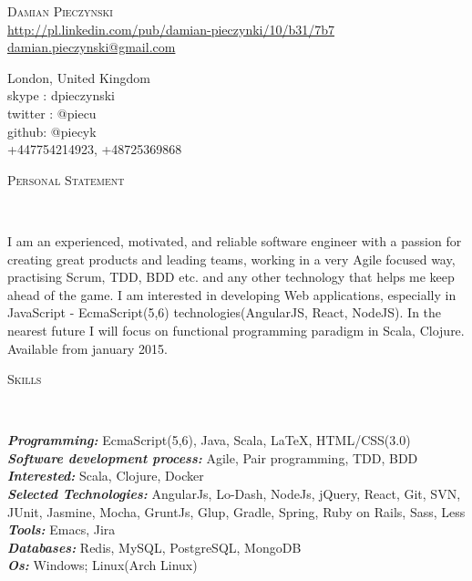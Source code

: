 \documentclass[9pt]{article}
\newenvironment{changemargin}[2]{%
  \begin{list}{}{%
      \setlength{\topsep}{0pt}%
      \setlength{\leftmargin}{#1}%
      \setlength{\rightmargin}{#2}%
      \setlength{\listparindent}{\parindent}%
      \setlength{\itemindent}{\parindent}%
      \setlength{\parsep}{\parskip}%
    }%
  \item[]}{\end{list}
}
\newcommand{\lineover}{
  \begin{changemargin}{-0.05in}{-0.05in}
    \vspace*{-8pt}
    \hrulefill \\
    \vspace*{-2pt}
  \end{changemargin}
}
\newcommand{\header}[1]{
	\begin{changemargin}{-0.5in}{-0.5in}
		\scshape{#1}\\
  	\lineover
	\end{changemargin}
}
\newcommand{\contact}[3]{
	\begin{changemargin}{-0.5in}{-0.5in}
		\begin{center}
			{\Large \scshape {#1}}\\ \smallskip
      {\url{#2}}\\ \smallskip
      {\href{mailto:#3}{#3}}\\ \smallskip
		\end{center}
	\end{changemargin}
}
\newenvironment{body} {
	\vspace*{-16pt}
	\begin{changemargin}{-0.25in}{-0.5in}
  }
	{\end{changemargin}
}
\begin{document}
\contact
    {Damian Pieczynski}
    {http://pl.linkedin.com/pub/damian-pieczynki/10/b31/7b7}
    {damian.pieczynski@gmail.com}
    {London, United Kingdom}\\
    {skype : dpieczynski}\\
    {twitter : @piecu}\\
    {github: @piecyk}\\
    {+447754214923, +48725369868}
    \medskip

\header{Personal Statement}
\begin{body}
  \vspace{14pt}
  I am an experienced, motivated, and reliable software engineer with a passion for creating great products and leading teams,
  working in a very Agile focused way, practising Scrum, TDD, BDD etc. and any other technology that helps me keep ahead of the game.
  I am interested in developing Web applications, especially in JavaScript - EcmaScript(5,6) technologies(AngularJS, React, NodeJS).
  In the nearest future I will focus on functional programming paradigm in Scala, Clojure.
  Available from january 2015.
\end{body}
\medskip


\header{Skills}
\begin{body}
  \vspace{14pt}
  \emph{\textbf{Programming:}}{} EcmaScript(5,6), Java, Scala, \LaTeX, HTML/CSS(3.0)\\
  \medskip
  \emph{\textbf{Software development process:}}{} Agile, Pair programming, TDD, BDD\\
  \medskip
  \emph{\textbf{Interested:}}{} Scala, Clojure, Docker\\
  \medskip
  \emph{\textbf{Selected Technologies:}}{} AngularJs, Lo-Dash, NodeJs, jQuery, React, Git, SVN, JUnit, Jasmine, Mocha, GruntJs, Glup, Gradle, Spring, Ruby on Rails, Sass, Less\\
  \medskip
  \emph{\textbf{Tools:}}{} Emacs, Jira\\
  \medskip
  \emph{\textbf{Databases:}}{} Redis, MySQL, PostgreSQL, MongoDB\\
  \medskip
  \emph{\textbf{Os:}}{} Windows; Linux(Arch Linux)\\
\end{body}
\medskip


\end{document}

